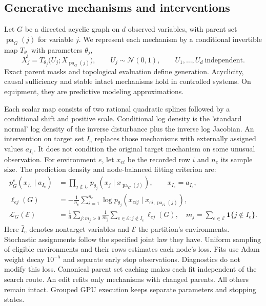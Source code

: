 \documentclass{svproc}
\newcommand{\pa}{\operatorname{pa}}
\newcommand{\NLL}{\mathcal{L}}
\begin{document}
\subsection{Generative mechanisms and interventions}
Let $G$ be a directed acyclic graph on $d$ observed variables, with parent set
$\pa_G(j)$ for variable $j$. We represent each mechanism by a conditional
invertible map $T_{\theta_j}$ with parameters $\theta_j$,
\begin{equation}
 X_j=T_{\theta_j}\bigl(U_j;X_{\pa_G(j)}\bigr),
 \qquad U_j\sim\mathcal{N}(0,1),\qquad U_1,\ldots,U_d\ \text{independent}.
 \label{eq:scm}
\end{equation}
Exact parent masks and topological evaluation define generation. Acyclicity,
causal sufficiency and stable intact mechanisms hold in controlled systems. On
equipment, they are predictive modeling approximations.

Each scalar map consists of two rational quadratic splines followed by a conditional
shift and positive scale. Conditional log density is the 'standard normal' log
density of the inverse disturbance plus the inverse log Jacobian. An intervention
on target set $I_e$ replaces those mechanisms with externally assigned values
$a_{I_e}$. It does not condition the original target mechanism on some unusual
observation. For environment $e$, let $x_{ei}$ be the recorded row $i$ and $n_e$ its
sample size. The prediction density and node-balanced fitting criterion are:
\begin{equation}
\begin{aligned}
 p_G^e(x_{\bar I_e}\mid a_{I_e})
   &=\prod_{j\notin I_e}p_{\theta_j}(x_j\mid x_{\pa_G(j)}),
       \qquad x_{I_e}=a_{I_e},\\
 \ell_{ej}(G)&=-\frac{1}{n_e}\sum_{i=1}^{n_e}
       \log p_{\theta_j}(x_{eij}\mid x_{ei,\pa_G(j)}),\\
 \NLL_G(\mathcal E)&=\frac{1}{d}\sum_{j:m_j>0}\frac{1}{m_j}
       \sum_{e\in\mathcal E:j\notin I_e}\ell_{ej}(G),
 \quad m_j=\sum_{e\in\mathcal E}\mathbf{1}\{j\notin I_e\}.
\end{aligned}
\label{eq:fit}
\end{equation}
Here $\bar I_e$ denotes nontarget variables and $\mathcal E$ the partition's
environments. Stochastic assignments follow the specified joint law they have.
Uniform sampling of eligible environments and their rows estimates each node's
loss. Fits use Adam weight decay $10^{-5}$ and separate early stop observations.
Diagnostics do not modify this loss.
Canonical parent set caching makes each fit independent of the search route.
An edit refits only mechanisms with changed parents. All others remain intact.
Grouped GPU execution keeps separate parameters and stopping states.
\end{document}
